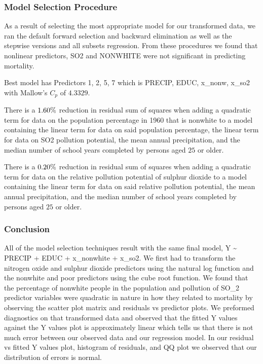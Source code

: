 \documentclass[]{article}
\begin{document}
\subsubsection{Model Selection
Procedure}\label{model-selection-procedure}

As a result of selecting the most appropriate model for our transformed
data, we ran the default forward selection and backward elimination as
well as the stepwise versions and all subsets regression. From these
procedures we found that nonlinear predictors, SO2 and NONWHITE were not
significant in predicting mortality.

Best model has Predictors 1, 2, 5, 7 which is PRECIP, EDUC, x\_nonw,
x\_so2 with Mallow's \(C_p\) of \(4.3329\).

There is a \(\Large 1.60\%\) reduction in residual sum of squares when
adding a quadratic term for data on the population percentage in 1960
that is nonwhite to a model containing the linear term for data on said
population percentage, the linear term for data on SO2 pollution
potential, the mean annual precipitation, and the median number of
school years completed by persons aged \(25\) or older.

There is a \(\Large 0.20\%\) reduction in residual sum of squares when
adding a quadratic term for data on the relative pollution potential of
sulphur dioxide to a model containing the linear term for data on said
relative pollution potential, the mean annual precipitation, and the
median number of school years completed by persons aged \(25\) or older.

\subsubsection{Conclusion}\label{conclusion}

All of the model selection techniques result with the same final model,
Y \textasciitilde{} PRECIP + EDUC + x\_nonwhite + x\_so2. We first had
to transform the nitrogen oxide and sulphur dioxide predictors using the
natural log function and the nonwhite and poor predictors using the cube
root function. We found that the percentage of nonwhite people in the
population and pollution of SO\_2 predictor variables were quadratic in
nature in how they related to mortality by observing the scatter plot
matrix and residuals vs predictor plots. We preformed diagnostics on
that transformed data and observed that the fitted Y values against the
Y values plot is approximately linear which tells us that there is not
much error between our observed data and our regression model. In our
residual vs fitted Y values plot, histogram of residuals, and QQ plot we
observed that our distribution of errors is normal.
\end{document}
